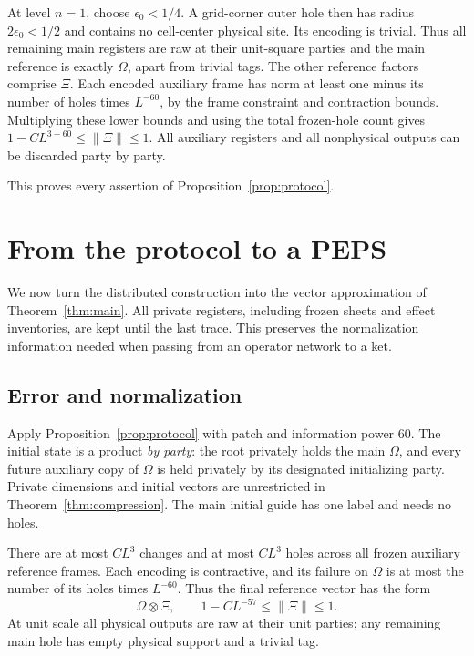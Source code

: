 \documentclass[11pt]{article}
\numberwithin{equation}{section}
\theoremstyle{definition}
\theoremstyle{remark}
\newcommand{\norm}[1]{\lVert #1\rVert}
\begin{document}
At level $n=1$, choose $\epsilon_0<1/4$.  A grid-corner outer hole
then has radius $2\epsilon_0<1/2$ and contains no cell-center physical
site.  Its encoding is trivial.  Thus all remaining main registers
are raw at their unit-square parties and the main reference is
exactly $\Omega$, apart from trivial tags.  The other reference
factors comprise $\Xi$.  Each encoded auxiliary frame has norm at
least one minus its number of holes times $L^{-60}$, by the frame
constraint and contraction bounds.  Multiplying these lower bounds
and using the total frozen-hole count gives
$1-C L^{3-60}\le\norm{\Xi}\le1$.  All auxiliary registers and all
nonphysical outputs can be discarded party by party.

This proves every assertion of Proposition~\ref{prop:protocol}.

\section{From the protocol to a PEPS}\label{sec:assembly}

We now turn the distributed construction into the vector approximation of
Theorem~\ref{thm:main}. All private registers, including frozen sheets and
effect inventories, are kept until the last trace. This preserves the
normalization information needed when passing from an operator network
to a ket.

\subsection{Error and normalization}

Apply Proposition~\ref{prop:protocol} with patch and information power $60$.
The initial state is a product \emph{by party}: the root privately holds
the main $\Omega$, and every future auxiliary copy of $\Omega$ is held
privately by its designated initializing party. Private dimensions and
initial vectors are unrestricted in Theorem~\ref{thm:compression}.
The main initial guide has one label and needs no holes.

There are at most $CL^3$ changes and at most $CL^3$ holes across all frozen
auxiliary reference frames. Each encoding is contractive, and its failure
on $\Omega$ is at most the number of its holes times $L^{-60}$. Thus the
final reference vector has the form
\begin{equation}\label{eq:reference-junk}
 \Omega\otimes\Xi,
 \qquad 1-CL^{-57}\le\norm{\Xi}\le1.
\end{equation}
At unit scale all physical outputs are raw at their unit parties; any
remaining main hole has empty physical support and a trivial tag.
\end{document}
